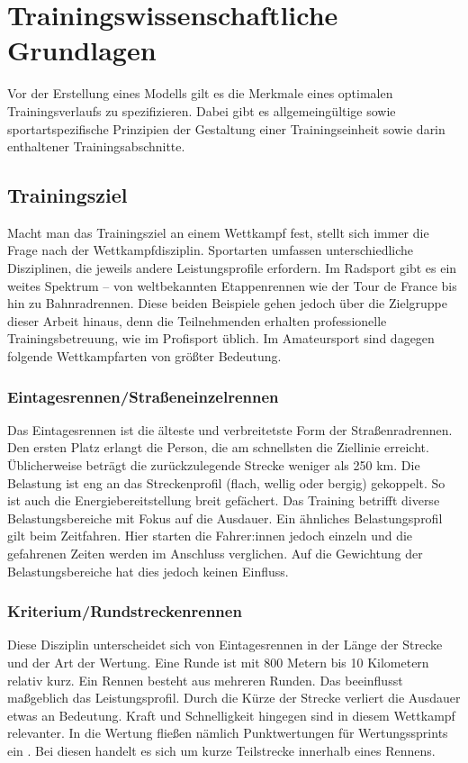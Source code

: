 \chapter{Trainingswissenschaftliche Grundlagen}
\label{sec:grundlagen:rad}
Vor der Erstellung eines Modells gilt es die Merkmale eines optimalen Trainingsverlaufs zu spezifizieren. Dabei gibt es allgemeingültige sowie sportartspezifische Prinzipien der Gestaltung einer Trainingseinheit sowie darin enthaltener Trainingsabschnitte.

\section{Trainingsziel}
Macht man das Trainingsziel an einem Wettkampf fest, stellt sich immer die Frage nach der Wettkampfdisziplin. Sportarten umfassen unterschiedliche Disziplinen, die jeweils andere Leistungsprofile erfordern. Im Radsport gibt es ein weites Spektrum -- von weltbekannten Etappenrennen wie der Tour de France bis hin zu Bahnradrennen. Diese beiden Beispiele gehen jedoch über die Zielgruppe dieser Arbeit hinaus, denn die Teilnehmenden erhalten professionelle Trainingsbetreuung, wie im Profisport üblich. Im Amateursport sind dagegen folgende Wettkampfarten von größter Bedeutung.
\subsection{Eintagesrennen/Straßeneinzelrennen}
\label{eintagesrennen}
Das Eintagesrennen ist die älteste und verbreitetste Form der Straßenradrennen. Den ersten Platz erlangt die Person, die am schnellsten die Ziellinie erreicht.
Üblicherweise beträgt die zurückzulegende Strecke weniger als 250 km. Die Belastung ist eng an das Streckenprofil (flach, wellig oder bergig) gekoppelt. So ist auch die Energiebereitstellung breit gefächert. Das Training betrifft diverse Belastungsbereiche mit Fokus auf die Ausdauer.
Ein ähnliches Belastungsprofil gilt beim Zeitfahren. Hier starten die Fahrer:innen jedoch einzeln und die gefahrenen Zeiten werden im Anschluss verglichen. Auf die Gewichtung der Belastungsbereiche hat dies jedoch keinen Einfluss. 
\subsection{Kriterium/Rundstreckenrennen}
Diese Disziplin unterscheidet sich von Eintagesrennen in der Länge der Strecke und der Art der Wertung. Eine Runde ist mit 800 Metern bis 10 Kilometern relativ kurz. Ein Rennen besteht aus mehreren Runden. 
Das beeinflusst maßgeblich das Leistungsprofil. Durch die Kürze der Strecke verliert die Ausdauer etwas an Bedeutung. Kraft und Schnelligkeit hingegen sind in diesem Wettkampf relevanter. In die Wertung fließen nämlich Punktwertungen für Wertungssprints ein . Bei diesen handelt es sich um kurze Teilstrecke innerhalb eines Rennens. 
